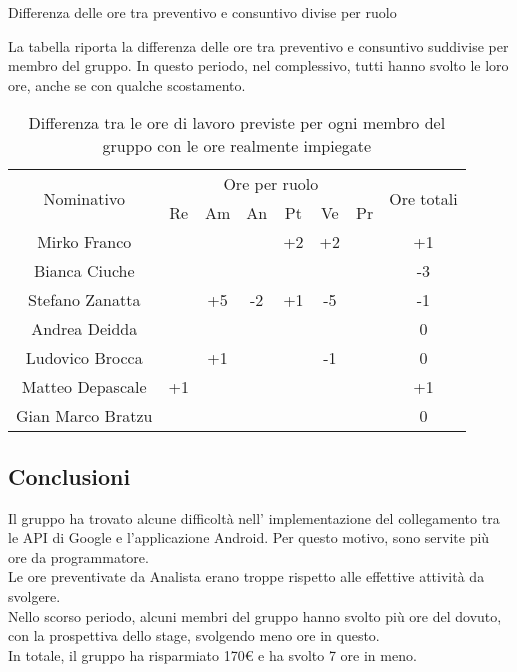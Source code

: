 \begin{flushleft}
\begin{table}[H]
\begin{center}
			\caption{Differenza delle ore tra preventivo e consuntivo divise per ruolo} 
		\end{center}
	\end{table}

	La tabella riporta la differenza delle ore tra preventivo e consuntivo suddivise per membro del gruppo. In questo periodo, nel complessivo, tutti hanno svolto le loro ore, anche se con qualche scostamento. 
	
	\begin{table}[H]
		\begin{center}
			\begin{tabularx}{\textwidth}{|c|cccccc|c|}
				
				\hline
				\multirow{2}{*}{Nominativo} & \multicolumn{6}{c|}{Ore per ruolo} & \multirow{2}{*}{Ore totali} \\ \cline{2-7}
				& Re & Am & An & Pt & Ve & Pr &      \\ \hline
				\endhead
				Mirko Franco       &   &  &   & +2   & +2 &  & +1        \\ \hline
				Bianca Ciuche      &   &  &  &    &  &  & -3        \\ \hline
				Stefano Zanatta    &   &+5& -2    &	+1   & -5 &  & -1        \\ \hline
				Andrea Deidda      &   &  &   &   &  &   & 0  		\\ \hline
				Ludovico Brocca    &   &+1&   &    &  -1 &  & 0        \\ \hline
				Matteo Depascale   & +1&  &  &  &  &    & +1  		\\ \hline
				Gian Marco Bratzu  &   &  &   &   &  &   & 0        \\ \hline
				
			\end{tabularx}
			\caption{Differenza tra le ore di lavoro previste per ogni membro del gruppo con le ore realmente impiegate }
		\end{center}
	\end{table}

	\subsection{Conclusioni}
	Il gruppo ha trovato alcune difficoltà nell' implementazione del collegamento tra le API di Google e l'applicazione Android. Per questo motivo, sono servite più ore da programmatore.\\Le ore preventivate da Analista erano troppe rispetto alle effettive attività da svolgere.\\
	Nello scorso periodo, alcuni membri del gruppo hanno svolto più ore del dovuto, con la prospettiva dello stage, svolgendo meno ore in questo.\\
	In totale, il gruppo ha risparmiato 170{\euro} e ha svolto 7 ore in meno.


\end{flushleft}
